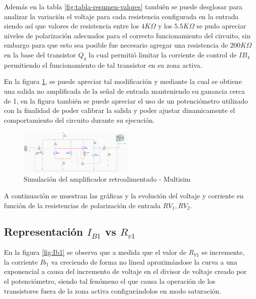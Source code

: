 \documentclass[conference]{IEEEtran}
\begin{document}
    Además en la tabla \ref{fig:tabla-resumen-valores} también se puede desglosar para analizar la variación el voltaje para cada resistencia configurada en la entrada siendo así que valores de resistencia entre los $4K\Omega$ y los $5.5K\Omega$ se pudo apreciar niveles de polarización adecuados para el correcto funcionamiento del circuito, sin embargo para que esto sea posible fue necesario agregar una resistencia de $200K\Omega$ en la base del transistor $Q_4$ la cual permitió limitar la corriente de control de $IB_4$ permitiendo el funcionamiento de tal transistor en su zona activa.
    
    \newpage

    En la figura \ref{fig:simulacion}, se puede apreciar tal modificación y mediante la cual se obtiene una salida no amplificada de la señal de entrada manteniendo su ganancia cerca de 1, en la figura también se puede apreciar el uso de un potenciómetro utilizado con la finalidad de poder calibrar la salida y poder ajustar dinamicamente el comportamiento del circuito durante su ejecución.

    \begin{figure}[h]
        \centering
        \includegraphics[width=0.5\textwidth]{media/simulacion.png}
        \caption{Simulación del amplificador retroalimentado - Multisim}
        \label{fig:simulacion}
    \end{figure}

    A continuación se muestran las gráficas y la evolución del voltaje y corriente en función de la resistencias de polarización de entrada $RV_1, RV_2$.
    
    \subsection{ Representación $I_{B1}$ vs $R_{v1}$}
    
    En la figura \ref{fig:Ib1} se observa que a medida que el valor de $R_{V1}$ se incremente, la corriente $Ib_1$ va creciendo de forma no lineal aproximándose la curva a una exponencial a causa del incremento de voltaje en el divisor de voltaje creado por el potenciómetro, siendo tal fenómeno el que causa la operación de los transistores fuera de la zona activa configurándolos en modo saturación.
    
\end{document}
